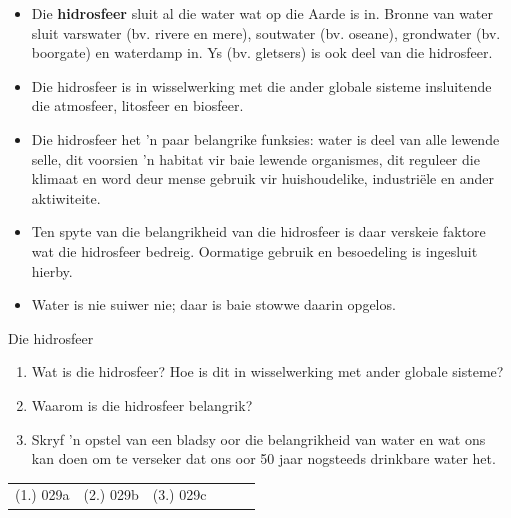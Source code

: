 \begin{itemize}[noitemsep]
\item Die \textbf{hidrosfeer} sluit al die water wat op die Aarde is in. Bronne van water sluit varswater (bv. rivere en mere), soutwater (bv. oseane), grondwater (bv. boorgate) en waterdamp in. Ys (bv. gletsers)  is ook deel van die hidrosfeer.
\label{m38138*uid93}\item Die hidrosfeer is in wisselwerking met die ander globale sisteme insluitende die atmosfeer, litosfeer en biosfeer.
\label{m38138*uid94}\item Die hidrosfeer het  'n paar belangrike funksies: water is deel van alle lewende selle, dit voorsien  'n habitat vir baie lewende organismes, dit reguleer die klimaat  en word deur mense gebruik  vir huishoudelike, industriële en ander aktiwiteite.
\label{m38138*uid106}\item Ten spyte van die belangrikheid van die hidrosfeer is daar verskeie faktore wat die hidrosfeer bedreig. Oormatige gebruik en besoedeling is ingesluit hierby.
\item Water is nie suiwer nie; daar is baie stowwe daarin opgelos.
\end{itemize}
\clearpage
\begin{eocexercises}{Die hidrosfeer}
            \nopagebreak

\begin{enumerate}[noitemsep, label=\textbf{\arabic*}. ] 
    \item Wat is die hidrosfeer? Hoe is dit in wisselwerking met ander globale sisteme?
    \item Waarom is die hidrosfeer belangrik?
    \item Skryf  'n opstel van een bladsy oor die belangrikheid van water en wat ons kan doen om te verseker dat ons oor 50 jaar nogsteeds drinkbare water het.
\end{enumerate}

\par \practiceinfo
\par \begin{tabular}[h]{cccccc}
(1.)	029a	&
(2.)	029b	&
(3.)	029c	&
\end{tabular}
\end{eocexercises}
